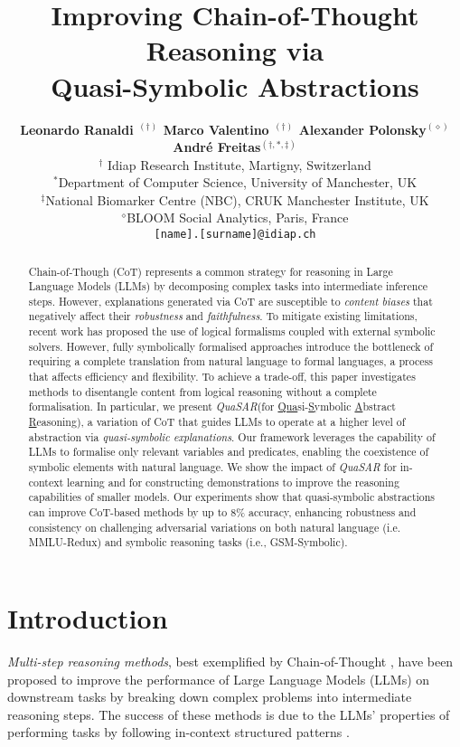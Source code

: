 \documentclass[11pt]{article}
\title{Improving Chain-of-Thought Reasoning  via \\Quasi-Symbolic Abstractions}
\author{\textbf{Leonardo Ranaldi $^{(\dagger)}$ Marco Valentino $^{(\dagger)}$ Alexander Polonsky$^{(\diamond)}$ Andr\'e Freitas$^{(\dagger,*, \ddagger)}$} \\
	$^{\dagger}$ Idiap Research Institute, Martigny, Switzerland \\
 $^{*}$Department of Computer Science, University of Manchester, UK \\
 $^{\ddagger}$National Biomarker Centre (NBC), CRUK Manchester Institute, UK\\
  $^{\diamond}$BLOOM Social Analytics, Paris, France\\
		{
  {\tt [name].[surname]@idiap.ch}
  } }
\newcommand{\QuaSAR}{\emph{QuaSAR}\xspace}
\begin{document}
\maketitle
\begin{abstract}
Chain-of-Though (CoT) represents a common strategy for reasoning in Large Language Models (LLMs) by decomposing complex tasks into intermediate inference steps. However, explanations generated via CoT are susceptible to \emph{content biases} that negatively affect their \emph{robustness} and \emph{faithfulness}.
To mitigate existing limitations, recent work has proposed the use of logical formalisms coupled with external symbolic solvers. However, fully symbolically formalised approaches introduce the bottleneck of requiring a complete translation from natural language to formal languages, a process that affects efficiency and flexibility.
To achieve a trade-off, this paper investigates methods to disentangle content from logical reasoning without a complete formalisation. In particular, we present \QuaSAR (for \underline{Qua}si-\underline{S}ymbolic \underline{A}bstract \underline{R}easoning), a variation of CoT that guides LLMs to operate at a higher level of abstraction via \emph{quasi-symbolic explanations}. Our framework leverages the capability of LLMs to formalise only relevant variables and predicates, enabling the coexistence of symbolic elements with natural language. We show the impact of \QuaSAR for in-context learning and for constructing demonstrations to improve the reasoning capabilities of smaller models. Our experiments show that quasi-symbolic abstractions can improve CoT-based methods by up to 8\% accuracy, enhancing robustness and consistency on challenging adversarial variations on both natural language (i.e. MMLU-Redux) and symbolic reasoning tasks (i.e., GSM-Symbolic).
\end{abstract}

\section{Introduction}


\textit{Multi-step reasoning methods}, best exemplified by Chain-of-Thought \cite{wei2022chain,wang2022self}, have been proposed to improve the performance of Large Language Models (LLMs) on downstream tasks by breaking down complex problems into intermediate reasoning steps. The success of these methods is due to the LLMs’ properties of performing tasks by following in-context structured patterns \cite{zhou2023leasttomostpromptingenablescomplex,dong2024surveyincontextlearning}.
\end{document}
